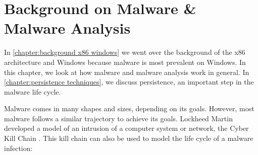 \chapter{Background on Malware \& Malware Analysis}\label{chapter:background malware}
In \autoref{chapter:background x86 windows} we went over the background of the x86 architecture and Windows because malware is most prevalent on Windows. In this chapter, we look at how malware and malware analysis work in general. In \autoref{chapter:persistence techniques}, we discuss persistence, an important step in the malware life cycle.

\medskip

Malware comes in many shapes and sizes, depending on its goals. However, most malware follows a similar trajectory to achieve its goals. Lockheed Martin developed a model of an intrusion of a computer system or network, the Cyber Kill Chain \cite{cyber_kill_chain}. This kill chain can also be used to model the life cycle of a malware infection:
